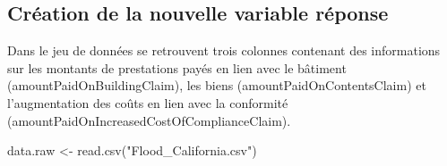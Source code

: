 \documentclass[
]{article}
\newenvironment{Shaded}{\begin{snugshade}}{\end{snugshade}}
\newcommand{\FunctionTok}[1]{\textcolor[rgb]{0.00,0.00,0.00}{#1}}
\newcommand{\NormalTok}[1]{#1}
\newcommand{\OtherTok}[1]{\textcolor[rgb]{0.56,0.35,0.01}{#1}}
\newcommand{\StringTok}[1]{\textcolor[rgb]{0.31,0.60,0.02}{#1}}
\begin{document}
\hypertarget{cruxe9ation-de-la-nouvelle-variable-ruxe9ponse}{%
\subsection{Création de la nouvelle variable
réponse}\label{cruxe9ation-de-la-nouvelle-variable-ruxe9ponse}}

Dans le jeu de données se retrouvent trois colonnes contenant des
informations sur les montants de prestations payés en lien avec le
bâtiment (amountPaidOnBuildingClaim), les biens
(amountPaidOnContentsClaim) et l'augmentation des coûts en lien avec la
conformité (amountPaidOnIncreasedCostOfComplianceClaim).

\begin{Shaded}
\begin{Highlighting}[]
\NormalTok{data.raw }\OtherTok{\textless{}{-}} \FunctionTok{read.csv}\NormalTok{(}\StringTok{"Flood\_California.csv"}\NormalTok{)}
\end{Highlighting}
\end{Shaded}
\end{document}
